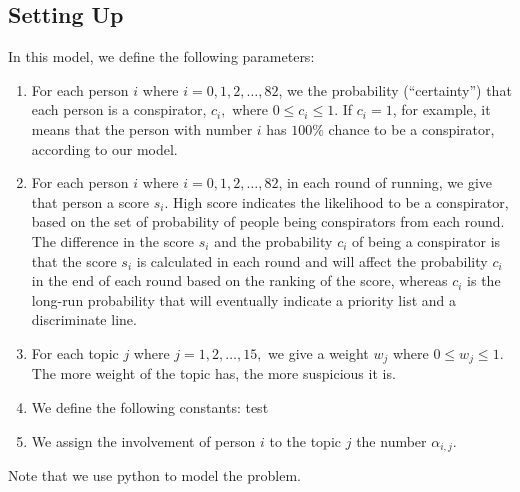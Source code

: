 \documentclass{icmmcm}
\begin{document}
\subsection{Setting Up}
In this model, we define the following parameters:
\begin{enumerate}
\item  For each person $i$ where $i=0,1,2,\ldots, 82$, 
we the probability (``certainty'')
that each person is a conspirator, $c_i,$
where $0\leq c_i \leq 1.$ 
If $c_i=1$, for example, it means that the person
with number $i$ has $100\%$ chance to be
a conspirator, according to our model. 

\item  For each person $i$ where $i=0,1,2,\ldots, 82$, in each round of running,
we give that person a score $s_i$. High score indicates
the likelihood to be a conspirator, based on the set
of probability of people being conspirators from each round.
The difference in the score $s_i$ and the probability $c_i$ of
being a conspirator is that the score $s_i$ is calculated in each round
and will affect the probability $c_i$ in the end of each round
based on the ranking of the score, whereas $c_i$ is the long-run
probability that will eventually indicate a priority list and
a discriminate line.

\item For each topic $j$ where $j=1,2,\ldots,15,$
we give a weight $w_j$ where $0\leq w_j\leq 1.$
The more weight of the topic has, the more suspicious it is.

\item We define the following constants:
\subitem test

\item  We assign the involvement of person $i$ to the topic $j$ the number
$\alpha_{i,j}.$
\end{enumerate}

Note that we use python to model the problem.
\end{document}
